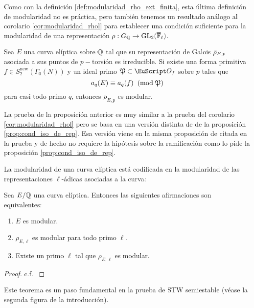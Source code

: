 \documentclass[../../tesis_maestria]{subfiles}
\begin{document}
Como con la definici\'on \ref{def:modularidad_rho_ext_finita}, esta \'ultima definici\'on de modularidad no es pr\'actica, pero tambi\'en tenemos un resultado an\'alogo al corolario \ref{cor:modularidad_rhol} para establecer una condici\'on suficiente para la modularidad de una representaci\'on $\rho:G_{\mathbb{Q}}\rightarrow\mathrm{GL}_2(\overline{\mathbb{F}}_\ell)$.

\begin{prop}\label{prop:cond_mod_rhop}
  Sea $E$ una curva el\'iptica sobre $\mathbb{Q}$ tal que su representaci\'on de Galois $\bar{\rho}_{E,p}$ asociada a sus puntos de $p-$torsi\'on es irreducible. Si existe una forma primitiva $f\in S_2^{\mathrm{new}}(\Gamma_0(N))$ y un ideal primo $\fP\subset\Oo_{f}$ sobre $p$ tales que
  \[
    a_q(E)\equiv a_q(f)\;\;(\mathrm{mod}\; \mathfrak{P})
  \]
para casi todo primo $q$, entonces $\bar{\rho}_{E,p}$ es modular.
\end{prop}
\begin{nota}
  La prueba de la proposici\'on anterior es muy similar a la prueba del corolario \ref{cor:modularidad_rhol} pero se basa en una versi\'on distinta de de la proposici\'on \ref{prop:cond_iso_de_rep}. Esa versi\'on viene en la misma proposici\'on de \cite{SaitoFLTBT} citada en la prueba y de hecho no requiere la hip\'otesis sobre la ramificaci\'on como lo pide la proposici\'on \ref{prop:cond_iso_de_rep}.
\end{nota}


La modularidad de una curva el\'iptica est\'a codificada en la modularidad de las representaciones $\ell$-\'adicas asociadas a la curva:

\begin{thm}\label{thm:equivmodular}
  Sea $E/\mathbb{Q}$ una curva el\'iptica. Entonces las siguientes afirmaciones son equivalentes:
  \begin{enumerate}
  \item $E$ es modular.
  \item $\rho_{E,\ell}$ es modular para todo primo $\ell$.
  \item Existe un primo $\ell$ tal que $\rho_{E,\ell}$ es modular.
  \end{enumerate}
\end{thm}

\begin{proof}
  c.f. \cite[\S3.4, proposici\'on 3.23]{SaitoFLTBT}
\end{proof}

Este teorema es un paso fundamental en la prueba de STW semiestable (v\'ease la segunda figura de la introducci\'on).
\end{document}
